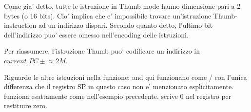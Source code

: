 Come gia' detto, tutte le istruzione in Thumb mode hanno dimensione pari a 2 bytes (o 16 bits).
Cio' implica che e' impossibile trovare un'istruzione Thumb-instruction ad un indirizzo dispari.
Secondo quanto detto, l'ultimo bit dell'indirizzo puo' essere omesso nell'encoding delle istruzioni.

Per riassumere, l'istruzione Thumb  puo' codificare un indirizzo in $current\_PC \pm{}\approx{}2M$.

Riguardo le altre istruzioni nella funzione: \PUSH and \POP qui funzionano come / con
l'unica differenza che il registro \ac{SP} in questo caso non e' menzionato esplicitamente.
 funziona esattamente come nell'esempio precedente.
 scrive 0 nel registro  per restituire zero.
